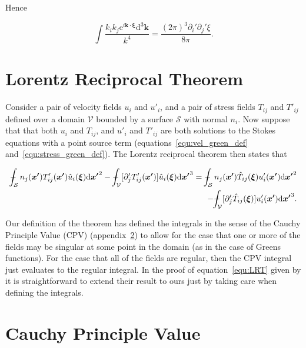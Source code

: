 \documentclass[12pt]{article}
\def\Xint#1{\mathchoice
{\XXint\displaystyle\textstyle{#1}}%
{\XXint\textstyle\scriptstyle{#1}}%
{\XXint\scriptstyle\scriptscriptstyle{#1}}%
{\XXint\scriptscriptstyle\scriptscriptstyle{#1}}%
\!\int}
\def\XXint#1#2#3{{\setbox0=\hbox{$#1{#2#3}{\int}$}
\vcenter{\hbox{$#2#3$}}\kern-.5\wd0}}
\def\dashint{\Xint-}
\begin{document}
Hence

\begin{equation}
\label{equ:green_u_int2}
\int \frac{k_{i} k_{j} \mathrm{e}^{i \boldsymbol{k} \cdot \boldsymbol{\xi}} \mathrm{d}^{3} \boldsymbol{k}}{k^{4}} = \frac{(2 \pi)^{3} \partial_{i}' \partial_{j}' \xi}{8 \pi} .
\end{equation}


\section{Lorentz Reciprocal Theorem}
\label{app:Lorentz}

Consider a pair of velocity fields $u_{i}$ and $u'_{i}$, and a pair of stress fields $T_{ij}$ and $T'_{ij}$ defined over a domain $\mathcal{V}$ bounded by a surface $\mathcal{S}$ with normal $n_{i}$. Now suppose that that both $u_{i}$ and $T_{ij}$, and $u'_{i}$ and $T'_{ij}$ are both solutions to the Stokes equations with a point source term (equations~\ref{equ:vel_green_def} and~\ref{equ:stress_green_def}). The Lorentz reciprocal theorem then states that \citep{Kim05}

\begin{align}
\label{equ:LRT}
\dashint_{\mathcal{S}} n_{j}(\boldsymbol{x'}) T'_{ij}(\boldsymbol{x'}) \hat{u}_{i}(\boldsymbol{\xi}) \mathrm{d} \boldsymbol{x'}^{2} - \dashint_{\mathcal{V}} [\partial'_{j} T'_{ij}(\boldsymbol{x'})] \hat{u}_{i}(\boldsymbol{\xi}) \mathrm{d} \boldsymbol{x'}^{3} = \dashint_{\mathcal{S}} n_{j}(\boldsymbol{x'}) \hat{T}_{ij}(\boldsymbol{\xi}) u'_{i}(\boldsymbol{x'}) \mathrm{d} \boldsymbol{x'}^{2} \nonumber \\
- \dashint_{\mathcal{V}} [\partial'_{j}\hat{T}_{ij}(\boldsymbol{\xi})] u'_{i}(\boldsymbol{x'}) \mathrm{d} \boldsymbol{x'}^{3} .
\end{align}

Our definition of the theorem has defined the integrals in the sense of the Cauchy Principle Value (CPV) (appendix~\ref{app:CPV}) to allow for the case that one or more of the fields may be singular at some point in the domain (as in the case of Greens functions). For the case that all of the fields are regular, then the CPV integral just evaluates to the regular integral. In the proof of equation~\ref{equ:LRT} given by \citet{Kim05} it is straightforward to extend their result to ours just by taking care when defining the integrals. 


\section{Cauchy Principle Value}
\label{app:CPV}
\end{document}

